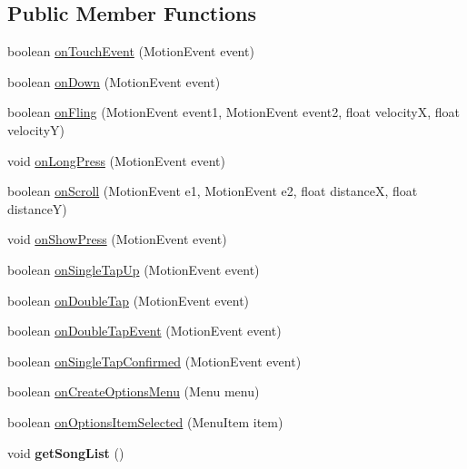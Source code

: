 \subsection*{Public Member Functions}
\begin{DoxyCompactItemize}
\item 
boolean \hyperlink{classcom_1_1chopin_1_1MainActivity_a7ec09bc1bf1dcc68d369944ef5fed402}{on\+Touch\+Event} (Motion\+Event event)
\item 
boolean \hyperlink{classcom_1_1chopin_1_1MainActivity_ab5d46829409221b8219ac8b62532d913}{on\+Down} (Motion\+Event event)
\item 
boolean \hyperlink{classcom_1_1chopin_1_1MainActivity_a36c4ffe7e22d3f38f76fb983a360e220}{on\+Fling} (Motion\+Event event1, Motion\+Event event2, float velocity\+X, float velocity\+Y)
\item 
void \hyperlink{classcom_1_1chopin_1_1MainActivity_a447c24c7e4c1b41a0dc5c0d79b9ad7fe}{on\+Long\+Press} (Motion\+Event event)
\item 
boolean \hyperlink{classcom_1_1chopin_1_1MainActivity_aa76ce37b188dd077445f1aed639c2f13}{on\+Scroll} (Motion\+Event e1, Motion\+Event e2, float distance\+X, float distance\+Y)
\item 
void \hyperlink{classcom_1_1chopin_1_1MainActivity_aae7a255f30fa62752950d9c90d7e68b2}{on\+Show\+Press} (Motion\+Event event)
\item 
boolean \hyperlink{classcom_1_1chopin_1_1MainActivity_a128a997abbbee5a98a2898b0fe133bcc}{on\+Single\+Tap\+Up} (Motion\+Event event)
\item 
boolean \hyperlink{classcom_1_1chopin_1_1MainActivity_a09ebaf817b98ece078802a4506ac21e8}{on\+Double\+Tap} (Motion\+Event event)
\item 
boolean \hyperlink{classcom_1_1chopin_1_1MainActivity_a5a850938c326c53f4f7f9bed58c7d606}{on\+Double\+Tap\+Event} (Motion\+Event event)
\item 
boolean \hyperlink{classcom_1_1chopin_1_1MainActivity_afac4ea8c714deb0bb38f98f96d8d0752}{on\+Single\+Tap\+Confirmed} (Motion\+Event event)
\item 
boolean \hyperlink{classcom_1_1chopin_1_1MainActivity_adc17ea5ad991259ddeeeb7f7ba1e9e6c}{on\+Create\+Options\+Menu} (Menu menu)
\item 
boolean \hyperlink{classcom_1_1chopin_1_1MainActivity_a84a10910a3e427d8043dc84cf80b103d}{on\+Options\+Item\+Selected} (Menu\+Item item)
\item 
\hypertarget{classcom_1_1chopin_1_1MainActivity_a1d1874fbf0786331a959fdd2faafe693}{}void {\bfseries get\+Song\+List} ()\label{classcom_1_1chopin_1_1MainActivity_a1d1874fbf0786331a959fdd2faafe693}


\end{DoxyCompactItemize}
